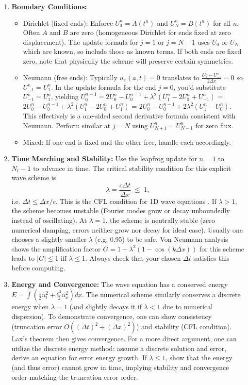 \documentclass[a4paper,11pt]{report}
\begin{document}
\begin{enumerate}
\begin{itemize}
          \end{itemize}
    \item \textbf{Boundary Conditions:}
          \begin{itemize}
              \item Dirichlet (fixed ends): Enforce $U_0^n = A(t^n)$ and $U_N^n = B(t^n)$ for all $n$. Often $A$ and $B$ are zero (homogeneous Dirichlet for ends fixed at zero displacement). The update formula for $j=1$ or $j=N-1$ uses $U_0$ or $U_N$ which are known, so include those as known terms. If both ends are fixed zero, note that physically the scheme will preserve certain symmetries.
              \item Neumann (free ends): Typically $u_x(a,t)=0$ translates to $\frac{U_1^n - U_{-1}^n}{2\Delta x}=0$ so $U_{-1}^n = U_1^n$. In the update formula for the end $j=0$, you’d substitute $U_{-1}^n = U_1^n$, yielding $U_0^{n+1} = 2U_0^n - U_0^{n-1} + \lambda^2 (U_1^n - 2U_0^n + U_{-1}^n)$ = $2U_0^n - U_0^{n-1} + \lambda^2 (U_1^n - 2U_0^n + U_1^n)$ = $2U_0^n - U_0^{n-1} + 2\lambda^2 (U_1^n - U_0^n)$. This effectively is a one-sided second derivative formula consistent with Neumann. Perform similar at $j=N$ using $U_{N+1}^n = U_{N-1}^n$ for zero flux.
              \item Mixed: If one end is fixed and the other free, handle each accordingly.
          \end{itemize}
    \item \textbf{Time Marching and Stability:} Use the leapfrog update for $n=1$ to $N_t-1$ to advance in time. The critical stability condition for this explicit wave scheme is
          $$\lambda = \frac{c\Delta t}{\Delta x} \;\le\; 1,$$
          i.e. $\Delta t \le \Delta x/c$. This is the CFL condition for 1D wave equations . If $\lambda>1$, the scheme becomes unstable (Fourier modes grow or decay unboundedly instead of oscillating). At $\lambda=1$, the scheme is neutrally stable (zero numerical damping, errors neither grow nor decay for ideal case). Usually one chooses a slightly smaller $\lambda$ (e.g. 0.95) to be safe. Von Neumann analysis shows the amplification factor $G = 1 - \lambda^2(1-\cos(k\Delta x))$ for this scheme leads to $|G| \le 1$ iff $\lambda \le 1$. Always check that your chosen $\Delta t$ satisfies this before computing.
    \item \textbf{Energy and Convergence:} The wave equation has a conserved energy $E = \int (\frac{1}{2}u_t^2 + \frac{c^2}{2}u_x^2)dx$. The numerical scheme similarly conserves a discrete energy when $\lambda=1$ (and slightly decays it if $\lambda<1$ due to numerical dispersion). To demonstrate convergence, one can show consistency (truncation error $O((\Delta t)^2 + (\Delta x)^2)$) and stability (CFL condition). Lax’s theorem then gives convergence. For a more direct argument, one can utilize the discrete energy method: assume a discrete solution and error, derive an equation for error energy growth. If $\lambda\le1$, show that the energy (and thus error) cannot grow in time, implying stability and convergence order matching the truncation error order.
\end{enumerate}
\end{document}
